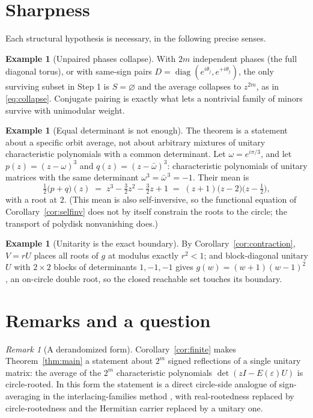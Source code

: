 \documentclass[11pt]{amsart}
\theoremstyle{definition}
\newtheorem{example}[theorem]{Example}
\theoremstyle{remark}
\newtheorem{remark}[theorem]{Remark}
\DeclareMathOperator{\diag}{diag}
\begin{document}
\section{Sharpness}\label{sec:sharp}

Each structural hypothesis is necessary, in the following precise senses.

\begin{example}[Unpaired phases collapse]\label{ex:collapse}
With $2m$ independent phases (the full diagonal torus), or with same-sign pairs $D = \diag(e^{i\theta_j}, e^{+i\theta_j})$, the only surviving subset in Step 1 is $S = \varnothing$ and the average collapses to $z^{2m}$, as in \eqref{eq:collapse}. Conjugate pairing is exactly what lets a nontrivial family of minors survive with unimodular weight.
\end{example}

\begin{example}[Equal determinant is not enough]\label{ex:equaldet}
The theorem is a statement about a specific orbit average, not about arbitrary mixtures of unitary characteristic polynomials with a common determinant. Let $\omega = e^{i\pi/3}$, and let $p(z) = (z - \omega)^3$ and $q(z) = (z - \bar\omega)^3$: characteristic polynomials of unitary matrices with the same determinant $\omega^3 = \bar\omega^{\,3} = -1$. Their mean is
\[
\tfrac12\bigl(p + q\bigr)(z) \;=\; z^3 - \tfrac32 z^2 - \tfrac32 z + 1 \;=\; (z + 1)\bigl(z - 2\bigr)\bigl(z - \tfrac12\bigr),
\]
with a root at $2$. (This mean is also self-inversive, so the functional equation of Corollary~\ref{cor:selfinv} does not by itself constrain the roots to the circle; the transport of polydisk nonvanishing does.)
\end{example}

\begin{example}[Unitarity is the exact boundary]\label{ex:boundary}
By Corollary~\ref{cor:contraction}, $V = rU$ places all roots of $g$ at modulus exactly $r^2 < 1$; and block-diagonal unitary $U$ with $2 \times 2$ blocks of determinants $1, -1, -1$ gives $g(w) = (w+1)(w-1)^2$, an on-circle double root, so the closed reachable set touches its boundary.
\end{example}

\section{Remarks and a question}\label{sec:remarks}

\begin{remark}[A derandomized form]
Corollary~\ref{cor:finite} makes Theorem~\ref{thm:main} a statement about $2^m$ signed reflections of a single unitary matrix: the average of the $2^m$ characteristic polynomials $\det(zI - E(\varepsilon)U)$ is circle-rooted. In this form the statement is a direct circle-side analogue of sign-averaging in the interlacing-families method \cite{MSS15, HPS18}, with real-rootedness replaced by circle-rootedness and the Hermitian carrier replaced by a unitary one.
\end{remark}
\end{document}
